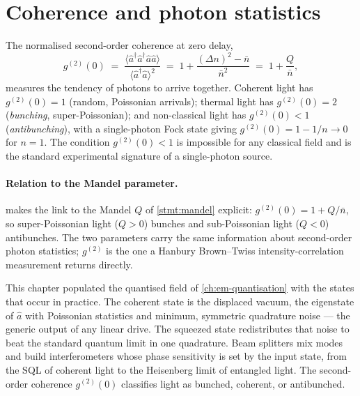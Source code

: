\section{Coherence and photon statistics}
\label{sec:g2}

\begin{statement}
\label{stmt:g2}
The normalised second-order coherence at zero delay,
\begin{equation}
\label{eq:g2}
g^{(2)}(0) \;=\; \frac{\langle\hat a^\dagger\hat a^\dagger\hat a\hat a\rangle}{\langle\hat a^\dagger\hat a\rangle^2}
\;=\; 1 + \frac{(\Delta n)^2-\bar n}{\bar n^2}
\;=\; 1+\frac{Q}{\bar n},
\end{equation}
measures the tendency of photons to arrive together. Coherent light
has $g^{(2)}(0)=1$ (random, Poissonian arrivals); thermal light has
$g^{(2)}(0)=2$ (\emph{bunching}, super-Poissonian); and
non-classical light has $g^{(2)}(0)<1$ (\emph{antibunching}), with a
single-photon Fock state giving $g^{(2)}(0)=1-1/n\to0$ for $n=1$.
The condition $g^{(2)}(0)<1$ is impossible for any classical field
and is the standard experimental signature of a single-photon
source.
\end{statement}

\paragraph{Relation to the Mandel parameter.}
 makes the link to the Mandel $Q$ of
\cref{stmt:mandel} explicit: $g^{(2)}(0)=1+Q/\bar n$, so
super-Poissonian light ($Q>0$) bunches and sub-Poissonian light
($Q<0$) antibunches. The two parameters carry the same information
about second-order photon statistics; $g^{(2)}$ is the one a
Hanbury Brown--Twiss intensity-correlation measurement returns
directly.

This chapter populated the quantised field of \cref{ch:em-quantisation}
with the states that occur in practice. The coherent state is the
displaced vacuum, the eigenstate of $\hat a$ with Poissonian
statistics and minimum, symmetric quadrature noise --- the generic
output of any linear drive. The squeezed state redistributes that
noise to beat the standard quantum limit in one quadrature. Beam
splitters mix modes and build interferometers whose phase
sensitivity is set by the input state, from the SQL of coherent
light to the Heisenberg limit of entangled light. The second-order
coherence $g^{(2)}(0)$ classifies light as bunched, coherent, or
antibunched.

